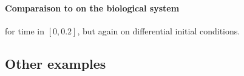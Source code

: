 \paragraph{Comparaison to \cite{Underapproxflowpipes} on the biological system}

for time in $[0,0.2]$, but again on differential initial conditions. 



\subsection{Other examples}







